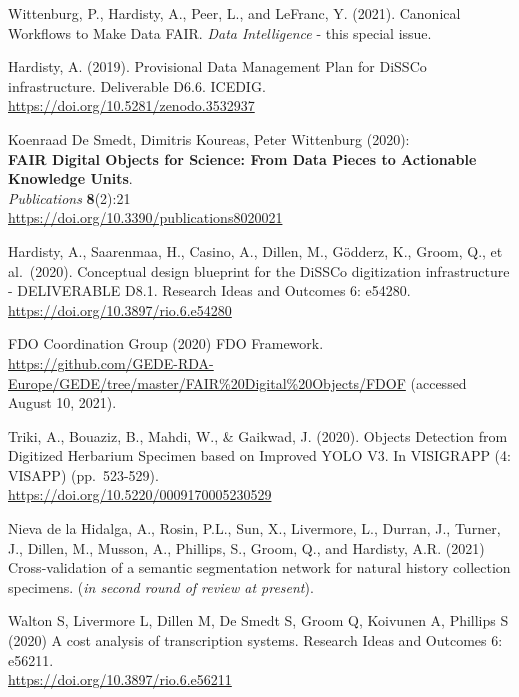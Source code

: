 \begin{thebibliography}{9}
Wittenburg, P., Hardisty, A., Peer, L., and LeFranc, Y. (2021).
Canonical Workflows to Make Data FAIR. \emph{Data Intelligence} - this
special issue.

Hardisty, A. (2019). Provisional Data Management Plan for
DiSSCo infrastructure. Deliverable D6.6. ICEDIG.\\
\url{https://doi.org/10.5281/zenodo.3532937}

Koenraad De Smedt, Dimitris Koureas, Peter Wittenburg (2020):\\
\textbf{FAIR Digital Objects for Science: From Data Pieces to Actionable
Knowledge Units}.\\
\emph{Publications} \textbf{8}(2):21\\
\url{https://doi.org/10.3390/publications8020021}

Hardisty, A., Saarenmaa, H., Casino, A., Dillen, M., Gödderz,
K., Groom, Q., et al.~(2020). Conceptual design blueprint for the DiSSCo
digitization infrastructure - DELIVERABLE D8.1. Research Ideas and
Outcomes 6: e54280.\\
\url{https://doi.org/10.3897/rio.6.e54280}

FDO Coordination Group (2020) FDO Framework.\\
\url{https://github.com/GEDE-RDA-Europe/GEDE/tree/master/FAIR\%20Digital\%20Objects/FDOF}
(accessed August 10, 2021).

Triki, A., Bouaziz, B., Mahdi, W., \& Gaikwad, J. (2020).
Objects Detection from Digitized Herbarium Specimen based on Improved
YOLO V3. In VISIGRAPP (4: VISAPP) (pp.~523-529).\\
\url{https://doi.org/10.5220/0009170005230529}

Nieva de la Hidalga, A., Rosin, P.L., Sun, X., Livermore, L.,
Durran, J., Turner, J., Dillen, M., Musson, A., Phillips, S., Groom, Q.,
and Hardisty, A.R. (2021) Cross-validation of a semantic segmentation
network for natural history collection specimens. (\emph{in second round
of review at present}).

Walton S, Livermore L, Dillen M, De Smedt S, Groom Q, Koivunen
A, Phillips S (2020) A cost analysis of transcription systems. Research
Ideas and Outcomes 6: e56211.\\
\url{https://doi.org/10.3897/rio.6.e56211}


\end{thebibliography}
